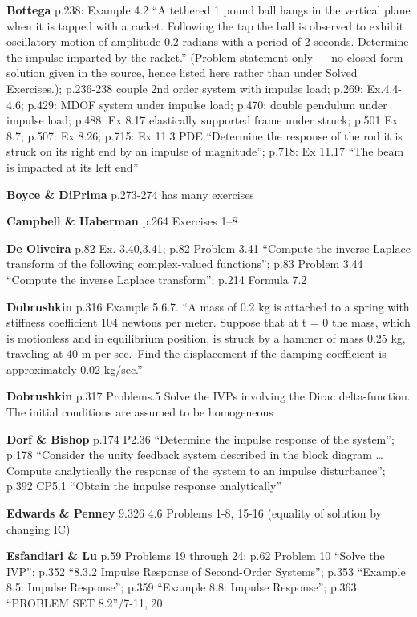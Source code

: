 \documentclass[
  11pt,
]{article}
\begin{document}
\textbf{Bottega} p.238: Example 4.2 ``A tethered 1 pound ball hangs in
the vertical plane when it is tapped with a racket. Following the tap
the ball is observed to exhibit oscillatory motion of amplitude 0.2
radians with a period of 2 seconds. Determine the impulse imparted by
the racket.'' (Problem statement only --- no closed-form solution given
in the source, hence listed here rather than under Solved Exercises.);
p.236-238 couple 2nd order system with impulse load; p.269: Ex.4.4-4.6;
p.429: MDOF system under impulse load; p.470: double pendulum under
impulse load; p.488: Ex 8.17 elastically supported frame under struck;
p.501 Ex 8.7; p.507: Ex 8.26; p.715: Ex 11.3 PDE ``Determine the
response of the rod it is struck on its right end by an impulse of
magnitude''; p.718: Ex 11.17 ``The beam is impacted at its left end''

\textbf{Boyce \& DiPrima} p.273-274 has many exercises

\textbf{Campbell \& Haberman} p.264 Exercises 1--8

\textbf{De Oliveira} p.82 Ex. 3.40,3.41; p.82 Problem 3.41 ``Compute the
inverse Laplace transform of the following complex-valued functions'';
p.83 Problem 3.44 ``Compute the inverse Laplace transform''; p.214
Formula 7.2

\textbf{Dobrushkin} p.316 Example 5.6.7. ``A mass of 0.2 kg is attached
to a spring with stiffness coefficient 104 newtons per meter. Suppose
that at t = 0 the mass, which is motionless and in equilibrium position,
is struck by a hammer of mass 0.25 kg, traveling at 40 m per sec.~Find
the displacement if the damping coefficient is approximately 0.02
kg/sec.''

\textbf{Dobrushkin} p.317 Problems.5 Solve the IVPs involving the Dirac
delta-function. The initial conditions are assumed to be homogeneous

\textbf{Dorf \& Bishop} p.174 P2.36 ``Determine the impulse response of
the system''; p.178 ``Consider the unity feedback system described in
the block diagram \ldots{} Compute analytically the response of the
system to an impulse disturbance''; p.392 CP5.1 ``Obtain the impulse
response analytically''

\textbf{Edwards \& Penney} 9.326 4.6 Problems 1-8, 15-16 (equality of
solution by changing IC)

\textbf{Esfandiari \& Lu} p.59 Problems 19 through 24; p.62 Problem 10
``Solve the IVP''; p.352 ``8.3.2 Impulse Response of Second-Order
Systems''; p.353 ``Example 8.5: Impulse Response''; p.359 ``Example 8.8:
Impulse Response''; p.363 ``PROBLEM SET 8.2''/7-11, 20
\end{document}
